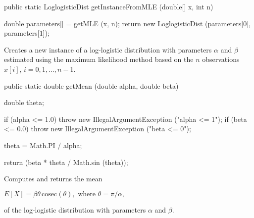 \begin{htmlonly}
\end{htmlonly}
\begin{code}

   public static LoglogisticDist getInstanceFromMLE (double[] x, int n)\begin{hide} {
      double parameters[] = getMLE (x, n);
      return new LoglogisticDist (parameters[0], parameters[1]);
   }\end{hide}
\end{code}
\begin{tabb}
   Creates a new instance of a log-logistic distribution with parameters
   $\alpha$ and $\beta$ estimated using the maximum likelihood method based on
   the $n$ observations $x[i]$, $i = 0, 1, \ldots, n-1$.
\end{tabb}
\begin{htmlonly}
\end{htmlonly}
\begin{code}

   public static double getMean (double alpha, double beta)\begin{hide} {
      double theta;

      if (alpha <= 1.0)
         throw new IllegalArgumentException ("alpha <= 1");
      if (beta <= 0.0)
         throw new IllegalArgumentException ("beta <= 0");

      theta = Math.PI / alpha;

      return (beta * theta / Math.sin (theta));
   }\end{hide}
\end{code}
\begin{tabb}  Computes and returns the mean
\begin{latexonly}
 $E[X] = \beta \theta \,\mbox{cosec}(\theta), \mbox{ where } \theta = \pi/\alpha,$
\end{latexonly}
   of the log-logistic distribution with parameters $\alpha$ and $\beta$.
\end{tabb}
\begin{htmlonly}
\end{htmlonly}
